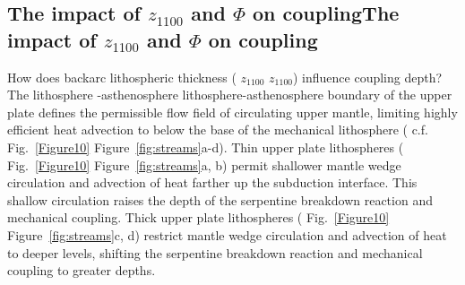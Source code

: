 \documentclass[draft,linenumbers]{agujournal2018} %
\providecommand{\DIFaddtex}[1]{{\protect\color{blue} \sf #1}} %
\providecommand{\DIFdeltex}[1]{{\protect\color{red} \scriptsize #1}} %
\providecommand{\DIFaddbegin}{} %
\providecommand{\DIFaddend}{} %
\providecommand{\DIFdelbegin}{} %
\providecommand{\DIFdelend}{} %
\providecommand{\DIFadd}[1]{\texorpdfstring{\DIFaddtex{#1}}{#1}} %
\providecommand{\DIFdel}[1]{\texorpdfstring{\DIFdeltex{#1}}{}} %
\newcommand{\DIFscaledelfig}{0.3}
\newlength{\DIFdelgraphicswidth} %
\newlength{\DIFdelgraphicsheight} %
\newcommand{\DIFaddincludegraphics}[2][]{{\color{blue}\fbox{\DIFOincludegraphics[#1]{#2}}}} %
\newcommand{\DIFdelincludegraphics}[2][]{%
\sbox{\DIFdelgraphicsbox}{\DIFOincludegraphics[#1]{#2}}%
\settoboxwidth{\DIFdelgraphicswidth}{\DIFdelgraphicsbox} %
\settoboxtotalheight{\DIFdelgraphicsheight}{\DIFdelgraphicsbox} %
\scalebox{\DIFscaledelfig}{%
\parbox[b]{\DIFdelgraphicswidth}{\usebox{\DIFdelgraphicsbox}\\[-\baselineskip] \rule{\DIFdelgraphicswidth}{0em}}\llap{\resizebox{\DIFdelgraphicswidth}{\DIFdelgraphicsheight}{%
\setlength{\unitlength}{\DIFdelgraphicswidth}%
\begin{picture}(1,1)%
\thicklines\linethickness{2pt} %
{\color[rgb]{1,0,0}\put(0,0){\framebox(1,1){}}}%
{\color[rgb]{1,0,0}\put(0,0){\line( 1,1){1}}}%
{\color[rgb]{1,0,0}\put(0,1){\line(1,-1){1}}}%
\end{picture}%
}\hspace*{3pt}}} %
} %
\DeclareRobustCommand{\DIFaddbegin}{\DIFOaddbegin \let\includegraphics\DIFaddincludegraphics} %
\DeclareRobustCommand{\DIFaddend}{\DIFOaddend \let\includegraphics\DIFOincludegraphics} %
\DeclareRobustCommand{\DIFdelbegin}{\DIFOdelbegin \let\includegraphics\DIFdelincludegraphics} %
\DeclareRobustCommand{\DIFdelend}{\DIFOaddend \let\includegraphics\DIFOincludegraphics} %
\begin{document}
\subsection{\DIFdelbegin \DIFdel{The impact of $z_{1100}$ and $\Phi$ on coupling}\DIFdelend \DIFaddbegin \texorpdfstring{The impact of \(z_{1100}\) and \(\Phi\) on
coupling}{The impact of z\_\{1100\} and \textbackslash Phi on coupling}\DIFaddend }
\DIFaddbegin

\DIFaddend How does backarc lithospheric thickness (\DIFdelbegin \DIFdel{$z_{1100}$}\DIFdelend \DIFaddbegin \DIFadd{\(z_{1100}\)}\DIFaddend ) influence
coupling depth? The \DIFdelbegin \DIFdel{lithosphere}%
\DIFdel{-asthenosphere }\DIFdelend \DIFaddbegin \DIFadd{lithosphere-asthenosphere }\DIFaddend boundary of the upper
plate defines the permissible flow field of circulating upper mantle,
limiting highly efficient heat advection to below the base of the
mechanical lithosphere (\DIFdelbegin \DIFdel{c.f. Fig.~\ref{Figure10}}\DIFdelend \DIFaddbegin \DIFadd{Figure~\ref{fig:streams}}\DIFaddend a-d). Thin upper plate
lithospheres (\DIFdelbegin \DIFdel{Fig.~\ref{Figure10}}\DIFdelend \DIFaddbegin \DIFadd{Figure~\ref{fig:streams}}\DIFaddend a, b) permit shallower mantle
wedge circulation and advection of heat farther up the subduction
interface. This shallow circulation raises the depth of the serpentine
breakdown reaction and mechanical coupling. Thick upper plate
lithospheres (\DIFdelbegin \DIFdel{Fig.~\ref{Figure10}}\DIFdelend \DIFaddbegin \DIFadd{Figure~\ref{fig:streams}}\DIFaddend c, d) restrict mantle wedge
circulation and advection of heat to deeper levels, shifting the
serpentine breakdown reaction and mechanical coupling to greater depths.

\DIFdelbegin %
\end{document}
